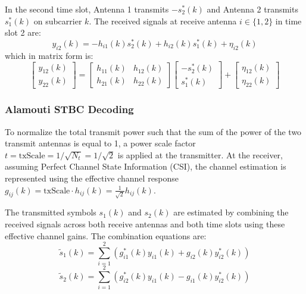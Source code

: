 \documentclass[a4paper]{article}
\begin{document}
In the second time slot, Antenna 1 transmits $-s_2^*(k)$ and Antenna 2 transmits $s_1^*(k)$ on subcarrier $k$. The received signals at receive antenna $i \in \{1, 2\}$ in time slot 2 are:
\begin{equation}
y_{i2}(k) = -h_{i1}(k) s_2^*(k) + h_{i2}(k) s_1^*(k) + \eta_{i2}(k)
\end{equation}
which in matrix form is:
\begin{equation}
\begin{bmatrix} y_{12}(k) \\ y_{22}(k) \end{bmatrix} = \begin{bmatrix} h_{11}(k) & h_{12}(k) \\ h_{21}(k) & h_{22}(k) \end{bmatrix} \begin{bmatrix} -s_2^*(k) \\ s_1^*(k) \end{bmatrix} + \begin{bmatrix} \eta_{12}(k) \\ \eta_{22}(k) \end{bmatrix}
\end{equation}

\subsubsection{Alamouti STBC Decoding}
To normalize the total transmit power such that the sum of the power of the two transmit antennas is equal to 1, a power scale factor $t = \text{txScale} = 1/\sqrt{N_t} = 1/\sqrt{2}$ is applied at the transmitter. At the receiver, assuming Perfect Channel State Information (CSI), the channel estimation is represented using the effective channel response $g_{ij}(k) = \text{txScale} \cdot h_{ij}(k) = \frac{1}{\sqrt{2}} h_{ij}(k)$.

The transmitted symbols $s_1(k)$ and $s_2(k)$ are estimated by combining the received signals across both receive antennas and both time slots using these effective channel gains. The combination equations are:
\begin{equation}
\tilde{s}_1(k) = \sum_{i=1}^{2} \left( g_{i1}^*(k) y_{i1}(k) + g_{i2}(k) y_{i2}^*(k) \right)
\end{equation}
\begin{equation}
\tilde{s}_2(k) = \sum_{i=1}^{2} \left( g_{i2}^*(k) y_{i1}(k) - g_{i1}(k) y_{i2}^*(k) \right)
\end{equation}
\end{document}
